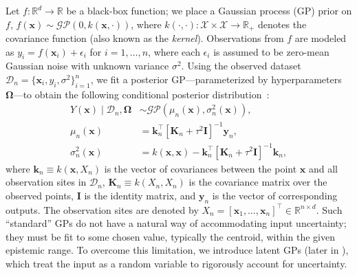 \documentclass[a4paper,12pt]{article}
\newcommand{\mbb}{\mathbb}
\newcommand{\mbf}{\mathbf}
\newcommand{\mcl}{\mathcal}
\newcommand{\bs}{\boldsymbol}
\newcommand{\x}{\mathbf{x}}
\newcommand{\X}{\mathcal{X}}
\begin{document}
Let $f: \mathbb{R}^d \rightarrow \mathbb{R}$ be a black-box function; we place a Gaussian process (GP) prior on $f$, $f(\x) \sim \mcl{GP}(0, k(\x, \cdot))$, where $k(\cdot, \cdot): \X \times \X \rightarrow \mbb{R}_{+}$ denotes the covariance function (also known as the \emph{kernel}). Observations from $f$ are modeled as $y_i = f(\x_i) + \epsilon_i$ for $i=1,\ldots,n$, where each $\epsilon_i$ is assumed to be zero-mean Gaussian noise with unknown variance $\sigma^2$. Using the observed dataset $\mcl{D}_n = \{\x_i, y_i, \sigma^2\}_{i=1}^n$, we fit a posterior GP---parameterized by hyperparameters $\bs{\Omega}$---to obtain the following conditional posterior distribution~\cite{Rasmussen2006}:
\begin{equation*}
\begin{split}
Y(\x) \mid \mcl{D}_n, \bs{\Omega} &\sim \mcl{GP}(\mu_n(\x), \sigma^2_n(\x)), \\
\mu_n(\x) &= \mbf{k}_n^\top [\mbf{K}_n + \tau^2 \mbf{I}]^{-1} \mbf{y}_n, \\
\sigma^2_n(\x) &= k(\x, \x) - \mbf{k}_n^\top [\mbf{K}_n + \tau^2 \mbf{I}]^{-1} \mbf{k}_n,
\end{split}
\end{equation*}
where $\mbf{k}_n \equiv k(\x, X_n)$ is the vector of covariances between the point $\x$ and all observation sites in $\mcl{D}_n$, $\mbf{K}_n \equiv k(X_n, X_n)$ is the covariance matrix over the observed points, $\mbf{I}$ is the identity matrix, and $\mbf{y}_n$ is the vector of corresponding outputs. The observation sites are denoted by $X_n = [\x_1,\ldots,\x_n]^\top \in \mbb{R}^{n \times d}$. Such ``standard'' GPs do not have a natural way of accommodating input uncertainty; they must be fit to some chosen value, typically the centroid, within the given epistemic range. To overcome this limitation, we introduce latent GPs (later in ), which treat the input as a random variable to rigorously account for uncertainty.
\end{document}
